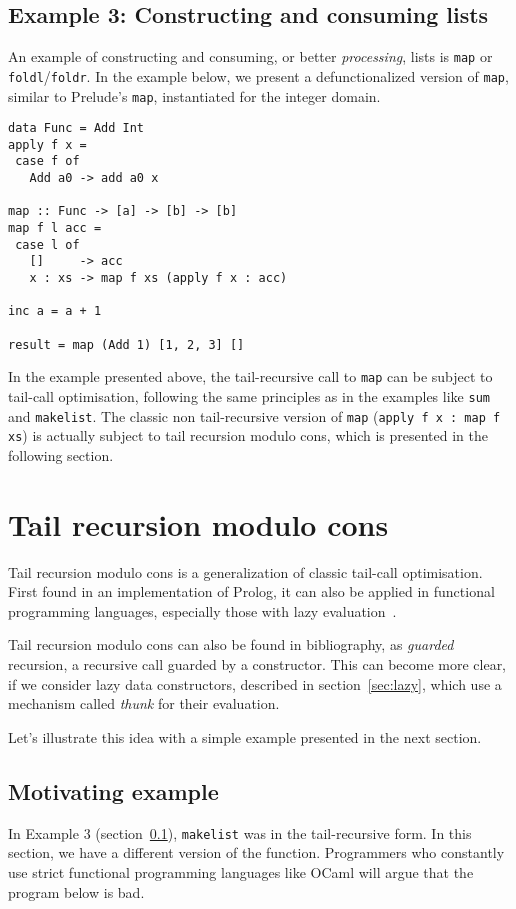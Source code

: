 \documentclass[diploma]{softlab-thesis}
\begin{document}
\subsection {Example 3: Constructing and consuming lists}
\label{sec:example3}

An example of constructing and consuming, or better \textit{processing}, lists is \texttt{map} or \texttt{foldl}/\texttt{foldr}.
In the example below, we present a defunctionalized version of \texttt{map}, similar to Prelude's \texttt{map}, instantiated for
the integer domain.

\begin{verbatim}
data Func = Add Int
apply f x =
 case f of
   Add a0 -> add a0 x

map :: Func -> [a] -> [b] -> [b]
map f l acc =
 case l of
   []     -> acc
   x : xs -> map f xs (apply f x : acc)

inc a = a + 1

result = map (Add 1) [1, 2, 3] []
\end{verbatim}
\noindent In the example presented above, 
the tail-recursive call to \texttt{map} can be subject to tail-call optimisation, 
following the same principles as in the examples like \texttt{sum} and \texttt{makelist}. The classic non tail-recursive 
version of \texttt{map} (\texttt{apply f x : map f xs}) is actually subject to tail recursion modulo cons, which is presented 
in the following section.

\section{Tail recursion modulo cons}
\label{sec:modulo-cons-example}

Tail recursion modulo cons is a generalization of classic tail-call optimisation. First found in an 
implementation of Prolog, it can also be applied in
functional programming languages, especially those with lazy evaluation~\cite{Wadler84}.

Tail recursion modulo cons can also be found in bibliography, as \textit{guarded} recursion, 
a recursive call guarded by a constructor. This can become more clear, if we consider lazy data constructors, 
described in section~\ref{sec:lazy}, which use a mechanism called \textit{thunk} for their evaluation.

Let's illustrate this idea with a simple example presented in the next section.

\subsection {Motivating example}
In Example 3 (section~\ref{sec:example3}), \texttt{makelist} was in the tail-recursive 
form. In this section, we have a different version of the function. 
Programmers who constantly use strict functional programming languages like OCaml 
will argue that the program below is bad. 
\end{document}

